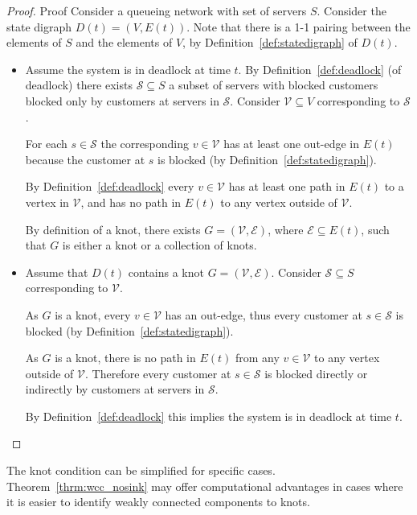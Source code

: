 \documentclass{article}
\numberwithin{equation}{section}
\begin{document}
\begin{proof}{Proof}
Consider a queueing network with set of servers $S$.
Consider the state digraph $D(t) = \left(V, E(t)\right)$.
Note that there is a 1-1 pairing between the elements of $S$ and the elements of
$V$, by Definition~\ref{def:statedigraph} of $D(t)$.

\begin{itemize}
  \item Assume the system is in deadlock at time $t$.
By Definition~\ref{def:deadlock} (of deadlock) there exists
$\mathcal{S} \subseteq S$ a subset of servers with blocked customers blocked
only by customers at servers in $\mathcal{S}$.
Consider $\mathcal{V} \subseteq V$ corresponding to $\mathcal{S}$.

For each $s \in \mathcal{S}$ the corresponding $v \in \mathcal{V}$ has at least
one out-edge in $E(t)$ because the customer at $s$ is blocked (by
Definition~\ref{def:statedigraph}).

By Definition~\ref{def:deadlock} every $v \in \mathcal{V}$ has at least one path
in $E(t)$ to a vertex in $\mathcal{V}$, and has no path in $E(t)$ to any vertex
outside of $\mathcal{V}$.

By definition of a knot, there exists
$G = \left(\mathcal{V}, \mathcal{E}\right)$, where $\mathcal{E} \subseteq E(t)$,
such that $G$ is either a knot or a collection of knots.

 \item Assume that $D(t)$ contains a knot
$G = \left(\mathcal{V}, \mathcal{E}\right)$.
Consider $\mathcal{S} \subseteq S$ corresponding to $\mathcal{V}$.

As $G$ is a knot, every $v \in \mathcal{V}$ has an out-edge, thus every customer
at $s \in \mathcal{S}$ is blocked (by Definition~\ref{def:statedigraph}).

As $G$ is a knot, there is no path in $E(t)$ from any $v \in \mathcal{V}$ to any
vertex outside of $\mathcal{V}$.
Therefore every customer at $s \in \mathcal{S}$ is blocked directly or
indirectly by customers at servers in $\mathcal{S}$.

By Definition~\ref{def:deadlock} this implies the system is in deadlock at time
$t$.

\end{itemize}
\end{proof}

The knot condition can be simplified for specific cases.
Theorem~\ref{thrm:wcc_nosink} may offer computational advantages in cases where
it is easier to identify weakly connected components to knots.
\end{document}
